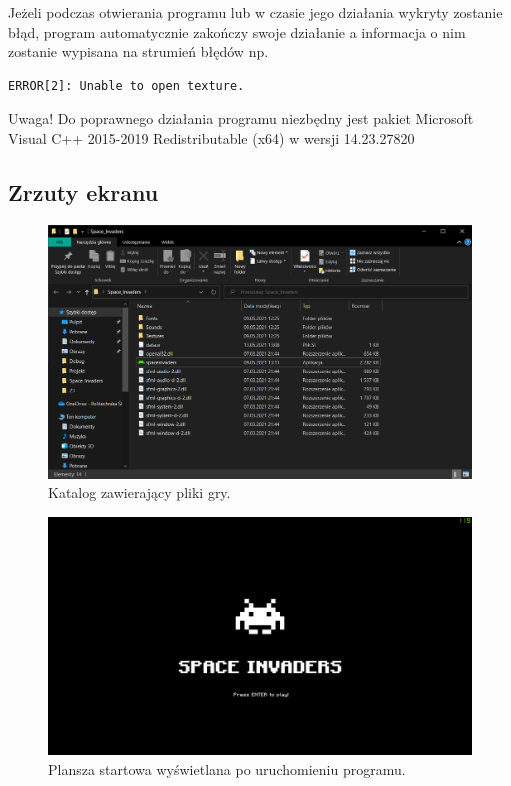 \documentclass[12pt,a4paper]{article}
\begin{document}
Jeżeli podczas otwierania programu lub w czasie jego działania wykryty zostanie błąd, program automatycznie zakończy swoje działanie a informacja o nim zostanie wypisana na strumień błędów np.

\begin{verbatim}
ERROR[2]: Unable to open texture.
\end{verbatim}


Uwaga! Do poprawnego działania programu niezbędny jest pakiet Microsoft Visual C++ 2015-2019 Redistributable (x64) w wersji 14.23.27820
\subsection{Zrzuty ekranu}
\begin{figure}[h]
\centering
\includegraphics[width=14cm]{katalog}
\caption{ \centering Katalog zawierający pliki gry.}
\label{fig:katalog}
\end{figure}

\clearpage

\begin{figure}[h]
\centering
\includegraphics[width=11.8cm]{start}
\caption{ \centering Plansza startowa wyświetlana po uruchomieniu programu.}
\label{fig:start}
\end{figure}
\end{document}
